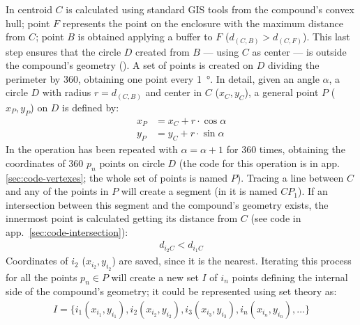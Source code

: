             In  centroid $C$ is calculated using standard GIS tools from the compound's convex hull; point $F$ represents the point on the enclosure with the maximum distance from $C$; point $B$ is obtained applying a buffer to $F$ ($d_{(C,B)} > d_{(C,F)}$). This last step ensures that the circle $D$ created from $B$ --- using $C$ as center --- is outside the compound's geometry (). A set of points is created on $D$ dividing the perimeter by 360, obtaining one point every \SI{1}{\degree}. In detail, given an angle $\alpha$, a circle $D$ with radius $r=d_{(C,B)}$ and center in $C$ ($x_C, y_C$), a general point $P$ ($x_P, y_P$) on $D$ is defined by:
            \begin{align}
                \label{eq:point-circle}
                x_P &= x_C + r\cdot\cos\alpha\\
                y_P &= y_C + r\cdot\sin\alpha
            \end{align}
            In  the operation has been repeated with $\alpha=\alpha+1$ for 360 times, obtaining the coordinates of 360 $p_n$ points on circle $D$ (the code for this operation is in app.\ref{sec:code-vertexes}; the whole set of points is named $P$). Tracing a line between $C$ and any of the points in $P$ will create a segment (in  it is named $CP_1$). If an intersection between this segment and the compound's geometry exists, the innermost point is calculated getting its distance from $C$ (see code in app.~\ref{sec:code-intersection}):
            \begin{align}
                \label{eq:innerpoint}
                d_{i_2 C} < d_{i_1 C}
            \end{align}
            Coordinates of $i_2$ ($x_{i_2}, y_{i_2}$) are saved, since it is the nearest. Iterating this process for all the points $p_n\in P$ will create a new set $I$ of $i_n$ points defining the internal side of the compound's geometry; it could be represented using set theory \cite{molenaar2003} as:
            \begin{align}
                \label{inter-set}
                I = \{ i_1 (x_{i_1}, y_{i_1}), i_2 (x_{i_2}, y_{i_2}), i_3 (x_{i_3}, y_{i_3}), i_n (x_{i_n}, y_{i_n}), \ldots \}
            \end{align}
